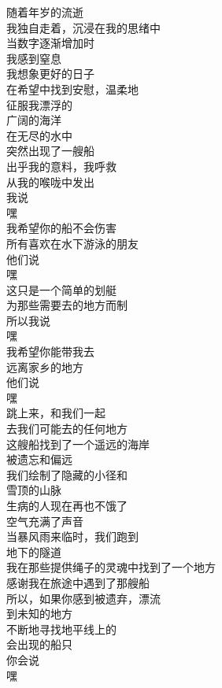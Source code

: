 \documentclass[12pt]{ctexart}
\begin{document}
\begin{paracol}{2}
		\switchcolumn
		
		\zhfont
		
		随着年岁的流逝\\
		我独自走着，沉浸在我的思绪中\\
		当数字逐渐增加时\\
		我感到窒息\\
		我想象更好的日子\\
		在希望中找到安慰，温柔地\\
		征服我漂浮的\\
		广阔的海洋\\
		在无尽的水中\\
		突然出现了一艘船\\
		出乎我的意料，我呼救\\
		从我的喉咙中发出\\
		我说\\
		嘿\\
		
		我希望你的船不会伤害\\
		所有喜欢在水下游泳的朋友\\
		他们说\\
		嘿\\
		
		这只是一个简单的划艇\\
		为那些需要去的地方而制\\
		所以我说\\
		嘿\\
		
		我希望你能带我去\\
		远离家乡的地方\\
		他们说\\
		嘿\\
		
		跳上来，和我们一起\\
		去我们可能去的任何地方\\
		这艘船找到了一个遥远的海岸\\
		被遗忘和偏远\\
		我们绘制了隐藏的小径和\\
		雪顶的山脉\\
		生病的人现在再也不饿了\\
		空气充满了声音\\
		当暴风雨来临时，我们跑到\\
		地下的隧道\\
		我在那些提供绳子的灵魂中找到了一个地方\\
		感谢我在旅途中遇到了那艘船\\
		所以，如果你感到被遗弃，漂流\\
		到未知的地方\\
		不断地寻找地平线上的\\
		会出现的船只\\
		你会说\\
		嘿\\
		

\end{paracol}
\end{document}
